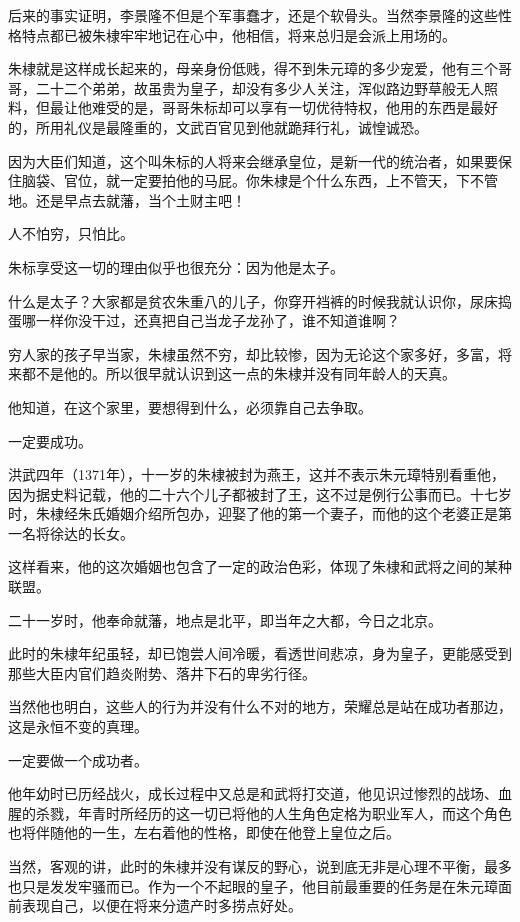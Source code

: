\begin{multicols}{\theparacolNo}
		后来的事实证明，李景隆不但是个军事蠢才，还是个软骨头。当然李景隆的这些性格特点都已被朱棣牢牢地记在心中，他相信，将来总归是会派上用场的。

		朱棣就是这样成长起来的，母亲身份低贱，得不到朱元璋的多少宠爱，他有三个哥哥，二十二个弟弟，故虽贵为皇子，却没有多少人关注，浑似路边野草般无人照料，但最让他难受的是，哥哥朱标却可以享有一切优待特权，他用的东西是最好的，所用礼仪是最隆重的，文武百官见到他就跪拜行礼，诚惶诚恐。

		因为大臣们知道，这个叫朱标的人将来会继承皇位，是新一代的统治者，如果要保住脑袋、官位，就一定要拍他的马屁。你朱棣是个什么东西，上不管天，下不管地。还是早点去就藩，当个土财主吧！

		人不怕穷，只怕比。

		朱标享受这一切的理由似乎也很充分：因为他是太子。

		什么是太子？大家都是贫农朱重八的儿子，你穿开裆裤的时候我就认识你，尿床捣蛋哪一样你没干过，还真把自己当龙子龙孙了，谁不知道谁啊？

		穷人家的孩子早当家，朱棣虽然不穷，却比较惨，因为无论这个家多好，多富，将来都不是他的。所以很早就认识到这一点的朱棣并没有同年龄人的天真。

		他知道，在这个家里，要想得到什么，必须靠自己去争取。

		一定要成功。

		洪武四年（1371年），十一岁的朱棣被封为燕王，这并不表示朱元璋特别看重他，因为据史料记载，他的二十六个儿子都被封了王，这不过是例行公事而已。十七岁时，朱棣经朱氏婚姻介绍所包办，迎娶了他的第一个妻子，而他的这个老婆正是第一名将徐达的长女。

		这样看来，他的这次婚姻也包含了一定的政治色彩，体现了朱棣和武将之间的某种联盟。

		二十一岁时，他奉命就藩，地点是北平，即当年之大都，今日之北京。

		此时的朱棣年纪虽轻，却已饱尝人间冷暖，看透世间悲凉，身为皇子，更能感受到那些大臣内官们趋炎附势、落井下石的卑劣行径。

		当然他也明白，这些人的行为并没有什么不对的地方，荣耀总是站在成功者那边，这是永恒不变的真理。

		一定要做一个成功者。

		他年幼时已历经战火，成长过程中又总是和武将打交道，他见识过惨烈的战场、血腥的杀戮，年青时所经历的这一切已将他的人生角色定格为职业军人，而这个角色也将伴随他的一生，左右着他的性格，即使在他登上皇位之后。

		当然，客观的讲，此时的朱棣并没有谋反的野心，说到底无非是心理不平衡，最多也只是发发牢骚而已。作为一个不起眼的皇子，他目前最重要的任务是在朱元璋面前表现自己，以便在将来分遗产时多捞点好处。


\end{multicols}
